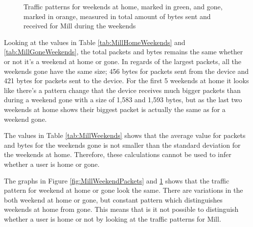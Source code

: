 \begin{figure}[H]
    \begin{subfigure}[b]{0.47\textwidth}
    \end{subfigure}
    \begin{subfigure}[b]{0.47\textwidth}
    \end{subfigure}
   \begin{subfigure}[b]{0.47\textwidth}
    \end{subfigure}
    \hspace{0.6cm}
    \begin{subfigure}[b]{0.47\textwidth}
    \end{subfigure}
    \caption{Traffic patterns for weekends at home, marked in green, and gone, marked in orange, measured in total amount of bytes sent and received for Mill during the weekends}
    \label{fig:MillWeekendBytes}
\end{figure}

Looking at the values in Table \ref{tab:MillHomeWeekends} and \ref{tab:MillGoneWeekends}, the total packets and bytes remains the same whether or not it's a weekend at home or gone. In regards of the largest packets, all the weekends gone have the same size; 456 bytes for packets sent from the device and 421 bytes for packets sent to the device. For the first 5 weekends at home it looks like there's a pattern change that the device receives much bigger packets than during a weekend gone with a size of 1,583 and 1,593 bytes, but as the last two weekends at home shows their biggest packet is actually the same as for a weekend gone. 

The values in Table \ref{tab:MillWeekends} shows that the average value for packets and bytes for the weekends gone is not smaller than the standard deviation for the weekends at home. Therefore, these calculations cannot be used to infer whether a user is home or gone. 

The graphs in Figure \ref{fig:MillWeekendPackets} and \ref{fig:MillWeekendBytes} shows that the traffic pattern for weekend at home or gone look the same. There are variations in the both weekend at home or gone, but constant pattern which distinguishes weekends at home from gone. This means that is it not possible to distinguish whether a user is home or not by looking at the traffic patterns for Mill.  

